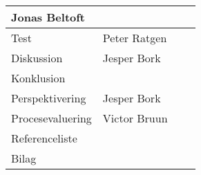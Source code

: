 \begin{table}[h!]
\begin{tabular}{|p{45mm}|p{30mm}|p{30mm}|p{35mm}|}
                                 Jonas Beltoft    &          &  \\ \hline
        Test                   & Peter Ratgen     &          &  \\ \hline
        Diskussion             & Jesper Bork      &          &  \\ \hline
        Konklusion             &                  &          &  \\ \hline
        Perspektivering        & Jesper Bork      &          &  \\ \hline
        Procesevaluering       & Victor Bruun     &          &  \\ \hline
        Referenceliste         &                  &          &  \\ \hline
        Bilag                  &                  &          &  \\ \hline
    \end{tabular}
\end{table}

\clearpage

